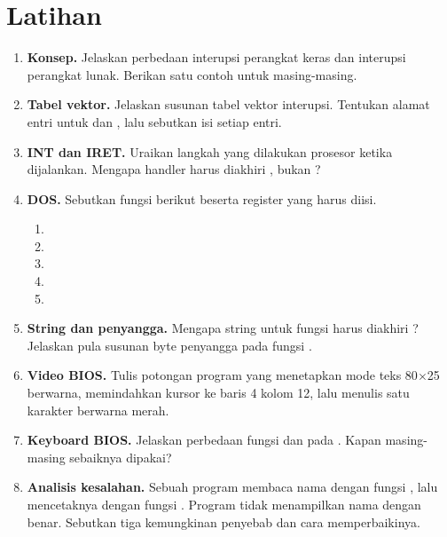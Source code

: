 \section{Latihan}
\label{sec:latihan-bab9}

\begin{enumerate}
    \item \textbf{Konsep.} Jelaskan perbedaan interupsi perangkat
          keras dan interupsi perangkat lunak. Berikan satu contoh
          untuk masing-masing.

    \item \textbf{Tabel vektor.} Jelaskan susunan tabel vektor
          interupsi. Tentukan alamat entri untuk  dan
          , lalu sebutkan isi setiap entri.

    \item \textbf{INT dan IRET.} Uraikan langkah yang dilakukan
          prosesor ketika  dijalankan. Mengapa handler
          harus diakhiri , bukan ?

    \item \textbf{DOS.} Sebutkan fungsi  berikut
          beserta register yang harus diisi.
          \begin{enumerate}
              \item {}
              \item {}
              \item {}
              \item {}
              \item {}
          \end{enumerate}

    \item \textbf{String dan penyangga.} Mengapa string untuk fungsi
           harus diakhiri ? Jelaskan pula susunan
          byte penyangga pada fungsi .

    \item \textbf{Video BIOS.} Tulis potongan program yang
          menetapkan mode teks 80$\times$25 berwarna, memindahkan
          kursor ke baris 4 kolom 12, lalu menulis satu karakter
           berwarna merah.

    \item \textbf{Keyboard BIOS.} Jelaskan perbedaan fungsi
           dan  pada . Kapan masing-
          masing sebaiknya dipakai?

    \item \textbf{Analisis kesalahan.} Sebuah program membaca nama
          dengan fungsi , lalu mencetaknya dengan fungsi
          . Program tidak menampilkan nama dengan benar.
          Sebutkan tiga kemungkinan penyebab dan cara
          memperbaikinya.
\end{enumerate}

